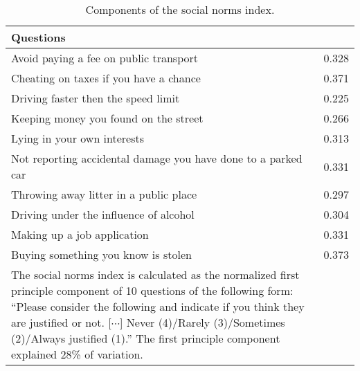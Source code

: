 \documentclass[12pt]{article}
\begin{document}
\begin{comment}
\clearpage

\begin{table}[ht]
\begin{center}
\tiny

\end{center}
\caption{Marginal effects for subject choice, periods 2-10, more controls}
\label{table6}
\end{table}
\end{comment}

\clearpage

\begin{table}[ht]
\begin{tabular}{p{15cm}c}
\hline \hline
Questions &  \\
\hline
Avoid paying a fee on public transport&0.328\\
Cheating on taxes if you have a chance&0.371\\
Driving faster then the speed limit&0.225\\
Keeping money you found on the street&0.266\\
Lying in your own interests&0.313\\
Not reporting accidental damage you have done to a parked car&0.331\\
Throwing away litter in a public place&0.297\\
Driving under the influence of alcohol&0.304\\
Making up a job application&0.331\\
Buying something you know is stolen&0.373\\
\hline \hline 
\footnotesize{The social norms index is calculated as the normalized first principle component of 10 questions of the following form: ``Please consider the following and indicate if you think they are justified or not. [$\cdots$] Never (4)/Rarely (3)/Sometimes (2)/Always justified (1).'' The first principle component explained 28\% of variation.}

\end{tabular}
\caption{Components of the social norms index. }
\label{tab:norms}
\end{table}
\end{document}
